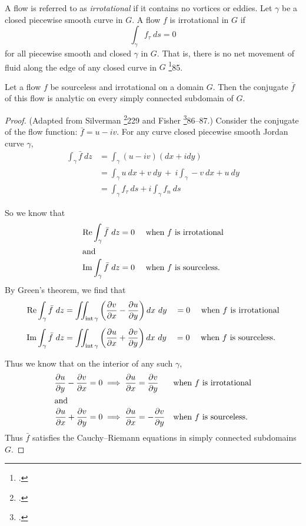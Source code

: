 \documentclass[letterpaper, twoside, 12 pt]{article}
\begin{document}
	\begin{definition}[Irrotational]
		A flow is referred to as \textit{irrotational} if it contains no vortices or eddies.
		Let $\gamma$ be a closed piecewise smooth curve in $G$.
		A flow $f$ is irrotational in $G$ if 
		\[
			\int_\gamma f_\tau \ ds = 0
		\]
		for all piecewise smooth and closed $\gamma$ in $G$.
		That is, there is no net movement of fluid along the edge of any closed curve in $G$ \footcite{fisher}{85}.
	\end{definition}


	\begin{theorem}
		Let a flow $f$ be sourceless and irrotational on a domain $G$.
		Then the conjugate $\bar f$ of this flow is analytic on every simply connected subdomain of $G$.
	\end{theorem}
	\begin{proof}
		(Adapted from Silverman \footcite{silverman}{229} and Fisher \footcite{fisher}{86--87}.)
		Consider the conjugate of the flow function: $\bar f = u - i v$.
		For any curve closed piecewise smooth Jordan curve $\gamma$,
		\begin{align*}
			\int_\gamma \bar f \ dz &= \int_\gamma (u - iv) (dx + i dy) \\
			&= \int_\gamma u\> dx + v\> dy \ + \ i \! \int_\gamma -v \> dx + u \> dy\\
			&= \int_\gamma f_\tau \ ds + i \int_\gamma f_n \ ds
		\end{align*}

		So we know that 
		\begin{align*}
			\operatorname*{Re} \int_\gamma \bar f \ dz &= 0 \quad \text{ when $f$ is irrotational}\\
			\intertext{and}
			\operatorname*{Im} \int_\gamma \bar f \ dz &= 0 \quad \text{ when $f$ is sourceless.}
		\end{align*}
		By Green's theorem, we find that 
		\begin{align*}
			\operatorname*{Re} \int_\gamma \bar f \ dz &= \iint_{\operatorname*{int} \gamma} \left( \frac{\partial v}{\partial x} - \frac{\partial u}{\partial y} \right) dx\ dy 
			\quad = 0 \quad \text{ when $f$ is irrotational}\\[1 ex]
			\operatorname*{Im} \int_\gamma \bar f \ dz &= \iint_{\operatorname*{int} \gamma} \left( \frac{\partial u}{\partial x} + \frac{\partial v}{\partial y} \right) dx\ dy 
			\quad = 0 \quad \text{ when $f$ is sourceless.}
		\end{align*}

		Thus we know that on the interior of any such $\gamma$, 
		\begin{align*}
			\frac{\partial u}{\partial y} - \frac{\partial v}{\partial x} &= 0 \implies \frac{\partial u}{\partial x} = \frac{\partial v}{\partial y} & &\text{when $f$ is irrotational} \\
			\intertext{and}
			\frac{\partial u}{\partial x} + \frac{\partial v}{\partial y} &= 0 \implies \frac{\partial u}{\partial x} = - \frac{\partial v}{\partial y} & &\text{when $f$ is sourceless.} \\
		\end{align*}
		Thus $\bar f$ satisfies the Cauchy--Riemann equations in simply connected subdomains $G$.
	\end{proof}
\end{document}
